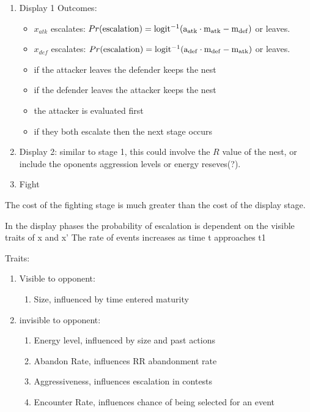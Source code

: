 \documentclass[a4paper,11pt]{article}
\begin{document}
\begin{enumerate}
    \item Display 1
        Outcomes:
        \begin{itemize}
            \item $x_{atk}$ escalates: 
                $Pr(\rm{escalation}) =  logit^{-1}(a_{atk} \cdot m_{atk} - m_{def})$
                or leaves.
            \item $x_{def}$ escalates:
                $Pr(\rm{escalation}) =  logit^{-1}(a_{def} \cdot m_{def} - m_{atk})$ 
                or leaves.
            \item if the attacker leaves the defender keeps the nest
            \item if the defender leaves the attacker keeps the nest
            \item the attacker is evaluated first
            \item if they both escalate then the next stage occurs
        \end{itemize}
    \item Display 2:
        similar to stage 1, this could involve the $R$ value of the nest, or include the oponents aggression levels or energy reseves(?).
    \item Fight
\end{enumerate}
The cost of the fighting stage is much greater than the cost of the display stage.

In the display phases the probability of escalation is dependent on the visible traits of x and x'
The rate of events increases as time t approaches t1

Traits:
\begin{enumerate}
    \item Visible to opponent:
    \begin{enumerate}
        \item Size, influenced by time entered maturity
    \end{enumerate}
    \item invisible to opponent:
    \begin{enumerate}
        \item Energy level, influenced by size and past actions
        \item Abandon Rate, influences RR abandonment rate
        \item Aggressiveness, influences escalation in contests
        \item Encounter Rate, influences chance of being selected for an event
    \end{enumerate}
\end{enumerate}
\clearpage
\end{document}

